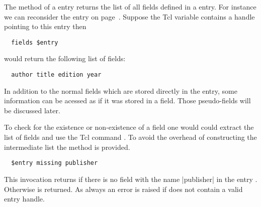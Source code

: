 The method  of a entry returns the list of all
fields defined in a entry. For instance we can reconsider the
\BibTeX{} entry on page~\pageref{example:bibtool}. Suppose the Tcl
variable  contains a handle pointing to this entry then
\begin{verbatim}
  fields $entry
\end{verbatim}%
\noindent
would return the following list of fields:
\begin{verbatim}
  author title edition year
\end{verbatim}

In addition to the normal fields which are stored directly in the
entry, some information can be acessed as if it was stored in a
field. Those pseudo-fields will be discussed later.

To check for the existence or non-existence of a field one would could
extract the list of fields and use the Tcl command . To
avoid the overhead of constructing the intermediate list the method
 is provided. 
\begin{verbatim}
  $entry missing publisher
\end{verbatim}%
This invocation returns  if there is no field with the name
|publisher| in the entry . Otherwise  is returned.
As always an error is raised if  does not contain a valid
entry handle.

